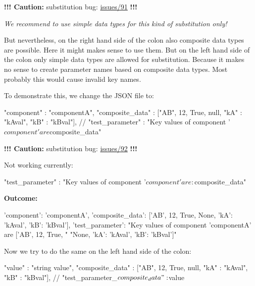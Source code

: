 \textbf{!!! Caution:} substitution bug:
\href{https://github.com/test-fullautomation/python-jsonpreprocessor/issues/91}{issues/91} \textbf{!!!}

\textit{We recommend to use simple data types for this kind of substitution only!}

But nevertheless, on the right hand side of the colon also composite data types are possible. Here it might makes sense to use them.
But on the left hand side of the colon only simple data types are allowed for substitution. Because it makes no sense to create
parameter names based on composite data types. Most probably this would cause invalid key names.

To demonstrate this, we change the JSON file to:

\begin{pythoncode}
{
   "component"      : "componentA",
   "composite_data" : ["AB", 12, True, null, {"kA" : "kAval", "kB" : "kBval"}],
   //
   "test_parameter" : "Key values of component '${component}' are ${composite_data}"
}
\end{pythoncode}

\textbf{!!! Caution:} substitution bug:
\href{https://github.com/test-fullautomation/python-jsonpreprocessor/issues/92}{issues/92} \textbf{!!!}

Not working currently:
\begin{pythoncode}
   "test_parameter" : "Key values of component '${component}' are: ${composite_data}"
\end{pythoncode}

\vspace{2ex}

\textbf{Outcome:}

\begin{pythonlog}
{'component': 'componentA',
 'composite_data': ['AB', 12, True, None, {'kA': 'kAval', 'kB': 'kBval'}],
 'test_parameter': "Key values of component 'componentA' are ['AB', 12, True, "
                   "None, {'kA': 'kAval', 'kB': 'kBval'}]"}
\end{pythonlog}

\newpage

Now we try to do the same on the left hand side of the colon:

\begin{pythoncode}
{
   "value"          : "string value",
   "composite_data" : ["AB", 12, True, null, {"kA" : "kAval", "kB" : "kBval"}],
   //
   "test_parameter_${composite_data}" : ${value}
}
\end{pythoncode}

